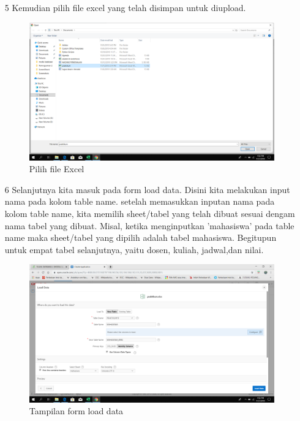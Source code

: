 \begin{enumerate}
\newpage
\item[5]Kemudian pilih file excel yang telah disimpan untuk diupload.

\begin{figure}[!htbp]
    \begin{center}
    \includegraphics[scale=0.2]{figures/8.png}
     \caption{Pilih file Excel}
    \end{center}   
    \end{figure}

\item[6]Selanjutnya kita masuk pada form load data. Disini kita melakukan input nama pada kolom table name. setelah memasukkan inputan nama pada kolom table name, kita memilih sheet/tabel yang telah dibuat sesuai dengam nama tabel yang dibuat. Misal, ketika menginputkan 'mahasiswa' pada table name maka sheet/tabel yang dipilih adalah tabel mahasiswa. Begitupun untuk empat tabel selanjutnya, yaitu dosen, kuliah, jadwal,dan nilai.

\begin{figure}[!htbp]
    \begin{center}
    \includegraphics[scale=0.2]{figures/9.png}
     \caption{Tampilan form load data}
    \end{center}   
    \end{figure}
    

\end{enumerate}
